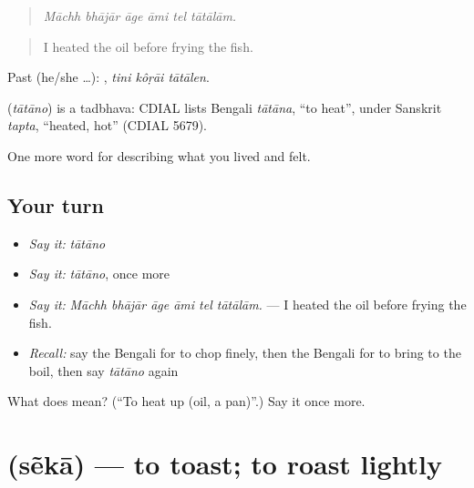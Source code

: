 \begin{quote}
     
\end{quote}

\begin{quote}
\emph{Māchh bhājār āge āmi tel tātālām.}
\end{quote}

\begin{quote}
I heated the oil before frying the fish.
\end{quote}

Past (he/she …):   , \emph{tini kôṛāi tātālen}.

\begin{cousinweb}
\textbf{} (\emph{tātāno}) is a tadbhava: CDIAL lists Bengali \emph{tātāna}, \textquotedblleft{}to heat\textquotedblright{}, under Sanskrit \emph{tapta}, \textquotedblleft{}heated, hot\textquotedblright{} (CDIAL 5679).
\end{cousinweb}

\begin{grammarlens}[title={What you've built}]
One more word for describing what you lived and felt.
\end{grammarlens}

\subsection*{Your turn}
\begin{itemize}
\raggedright
  \item \emph{Say it:} \emph{tātāno}
  \item \emph{Say it:} \emph{tātāno}, once more
  \item \emph{Say it:} \emph{Māchh bhājār āge āmi tel tātālām.} — I heated the oil before frying the fish.
  \item \emph{Recall:} say the Bengali for to chop finely, then the Bengali for to bring to the boil, then say \emph{tātāno} again
\end{itemize}

\begin{tcolorbox}[breakable,colback=teal!4,colframe=teal!35!black,title={Before you move on}]
What does  mean? (\textquotedblleft{}To heat up (oil, a pan)\textquotedblright{}.) Say it once more.
\end{tcolorbox}
\section[\texorpdfstring{\bn{সেঁকা} (sẽkā)}{সেঁকা (sẽkā)}]{ (sẽkā) — to toast; to roast lightly}

